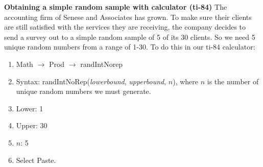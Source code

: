 \documentclass{report}
\begin{document}
        \bigbreak \noindent 
        \textbf{Obtaining a simple random sample with calculator (ti-84)}
        \bigbreak \noindent 
        The accounting firm of Senese and Associates has grown. To make sure their clients are still satisfied with the services they are receiving, the company decides to send a survey out to a simple random sample of 5 of its 30 clients.
        \bigbreak \noindent 
        So we need 5 unique random numbers from a range of 1-30. To do this in our ti-84 calculator:
        \begin{enumerate}
            \item Math $\rightarrow$ Prod $\rightarrow$ randIntNorep
            \item Syntax: randIntNoRep(\textit{lowerbound}, \textit{upperbound}, \textit{$n$}), where $n$ is the number of unique random numbers we must generate.
            \item Lower: 1
            \item Upper: 30
            \item $n$: 5
            \item Select Paste.
        \end{enumerate}

        \pagebreak \bigbreak \noindent
\end{document}
